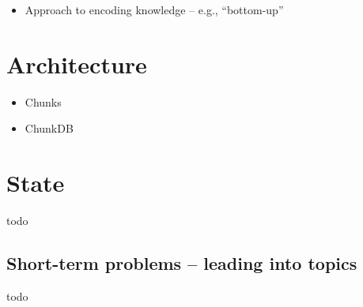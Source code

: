 \begin{itemize}
    \item Approach to encoding knowledge -- e.g., ``bottom-up''
\end{itemize}

\section{Architecture}

\begin{itemize}
    \item Chunks
    \item ChunkDB
\end{itemize}

\section{State}
todo

\subsection{Short-term problems -- leading into topics}
todo
